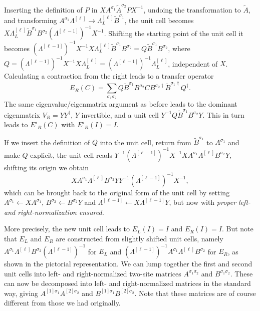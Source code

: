 \documentclass[a4paper,10pt,oneside,onecolumn,1p,times]{elsarticle}
\begin{document}
Inserting the definition of $P$ in $X A^{\sigma_1}\tilde{A}^{\sigma_2}P X^{-1}$, undoing the transformation to $\tilde{A}$, and transforming $A^{\sigma_1} \Lambda^{[\ell]} \rightarrow \Lambda^{[\ell]}_L \tilde{B}^{\sigma_1}$, the unit cell becomes $X \Lambda^{[\ell]}_L \tilde{B}^{\sigma_1} B^{\sigma_2} (\Lambda^{[\ell-1]})^{-1} X^{-1}$. Shifting the starting point of the unit cell it becomes $(\Lambda^{[\ell-1]})^{-1} X^{-1} X \Lambda^{[\ell]}_L \tilde{B}^{\sigma_1} B^{\sigma_2} = Q \tilde{B}^{\sigma_1} B^{\sigma_2}$, where $Q = (\Lambda^{[\ell-1]})^{-1} X^{-1} X \Lambda_L^{[\ell]} = (\Lambda^{[\ell-1]})^{-1} \Lambda_L^{[\ell]}$, independent of $X$. Calculating a contraction from the right leads to a transfer operator
\begin{equation}
E_R(C) = \sum_{\sigma_1\sigma_2} Q \tilde{B}^{\sigma_1} B^{\sigma_2} C B^{\sigma_2\dagger} \tilde{B}^{\sigma_1\dagger} Q^\dagger .
\end{equation}
The same eigenvalue/eigenmatrix argument as before leads to the dominant eigenmatrix $V_R = YY^\dagger$, $Y$ invertible, and a unit cell $Y^{-1}Q \tilde{B}^{\sigma_1} B^{\sigma_2} Y$.
This in turn leads to $E'_R(C)$ with $E'_R(I)=I$. 

If we insert the definition of $Q$ into the unit cell, return from $\tilde{B}^{\sigma_1}$ to $A^{\sigma_1}$ and make $Q$ explicit, the unit cell reads 
$Y^{-1}  (\Lambda^{[\ell-1]})^{-1} X^{-1} X A^{\sigma_1} \Lambda^{[\ell]} B^{\sigma_2} Y$, shifting its origin we obtain
\begin{equation}
X A^{\sigma_1} \Lambda^{[\ell]} B^{\sigma_2} Y Y^{-1}  (\Lambda^{[\ell-1]})^{-1} X^{-1} ,
\end{equation}
which can be brought back to the original form of the unit cell by setting 
$A^{\sigma_1} \leftarrow XA^{\sigma_1}$, $B^{\sigma_2} \leftarrow B^{\sigma_2}Y$ and $\Lambda^{[\ell-1]} \leftarrow X\Lambda^{[\ell-1]}Y$, but now with {\em proper left- and right-normalization ensured.} 

More precisely, the new unit cell leads to $E_L(I)=I$ and $E_R(I)=I$. But note that $E_L$ and $E_R$ are constructed from slightly shifted unit cells, namely $A^{\sigma_1} \Lambda^{[\ell]} B^{\sigma_2} (\Lambda^{[\ell-1]})^{-1}$ for $E_L$ and $(\Lambda^{[\ell-1]})^{-1} A^{\sigma_1} \Lambda^{[\ell]} B^{\sigma_2}$ for $E_R$, as shown in the pictorial representation. We can lump together the first and second unit cells into left- and right-normalized two-site matrices $A^{\sigma_1\sigma_2}$ and $B^{\sigma_1\sigma_2}$. These can now be decomposed into left- and right-normalized matrices in the standard way, giving $A^{[1]\sigma_1}A^{[2]\sigma_2}$ and $B^{[1]\sigma_1}B^{[2]\sigma_2}$. Note that these matrices are of course different from those we had originally.
\end{document}
